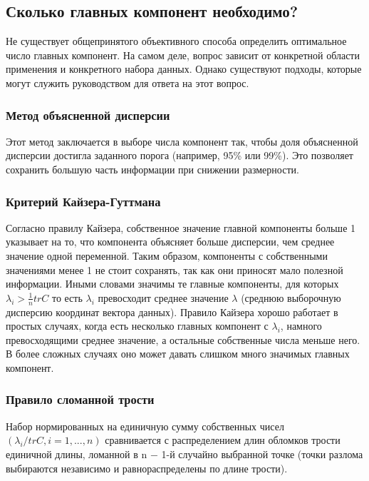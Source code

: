 \subsection{Сколько главных компонент необходимо?}

Не существует общепринятого объективного способа определить оптимальное число главных компонент. На самом деле, вопрос зависит от конкретной области применения и конкретного набора данных. Однако существуют подходы, которые могут служить руководством для ответа на этот вопрос.

\subsubsection{Метод объясненной дисперсии}
Этот метод заключается в выборе числа компонент так, чтобы доля объясненной дисперсии достигла заданного порога (например, 95\% или 99\%). Это позволяет сохранить большую часть информации при снижении размерности.

\subsubsection{Критерий Кайзера-Гуттмана}
Согласно правилу Кайзера, собственное значение главной компоненты больше 1 указывает на то, что компонента объясняет больше дисперсии, чем среднее значение одной переменной. Таким образом, компоненты с собственными значениями менее 1 не стоит сохранять, так как они приносят мало полезной информации. Иными словами значимы те главные компоненты, для которых $\displaystyle \lambda _{i}>\frac {1}{n} tr C$ то есть 
$\displaystyle \lambda _{i}$ превосходит среднее значение 
$ \displaystyle \lambda$ (среднюю выборочную дисперсию координат вектора данных). Правило Кайзера хорошо работает в простых случаях, когда есть несколько главных компонент с 
$\displaystyle \lambda _{i}$, намного превосходящими среднее значение, а остальные собственные числа меньше него. В более сложных случаях оно может давать слишком много значимых главных компонент. 

\subsubsection{Правило сломанной трости}
Набор нормированных на единичную сумму собственных чисел $(\displaystyle \lambda _{i}/ tr C, i = 1, ... ,n)$ сравнивается с распределением длин обломков трости единичной длины, ломанной в n − 1-й случайно выбранной точке (точки разлома выбираются независимо и равнораспределены по длине трости).

